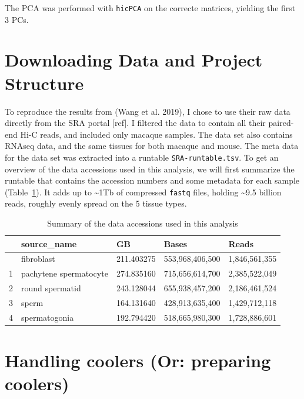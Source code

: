 \documentclass[
  11pt,
  a4paper,
]{scrbook}
\begin{document}
The PCA was performed with \texttt{hicPCA} on the correcte matrices,
yielding the first 3 PCs.

\section{Downloading Data and Project
Structure}\label{downloading-data-and-project-structure}

To reproduce the results from (Wang et al. 2019), I chose to use their
raw data directly from the SRA portal {[}ref{]}. I filtered the data to
contain all their paired-end Hi-C reads, and included only macaque
samples. The data set also contains RNAseq data, and the same tissues
for both macaque and mouse. The meta data for the data set was extracted
into a runtable \texttt{SRA-runtable.tsv}. To get an overview of the
data accessions used in this analysis, we will first summarize the
runtable that contains the accession numbers and some metadata for each
sample (Table~\ref{tbl-runtable-summary}). It adds up to
\textasciitilde1Tb of compressed \texttt{fastq} files, holding
\textasciitilde9.5 billion reads, roughly evenly spread on the 5 tissue
types.

\small

\begin{longtable}[]{@{}lllll@{}}

\caption{\label{tbl-runtable-summary}Summary of the data accessions used
in this analysis}

\tabularnewline

\toprule\noalign{}
& source\_name & GB & Bases & Reads \\
\midrule\noalign{}
\endhead
\bottomrule\noalign{}
\endlastfoot
0 & fibroblast & 211.403275 & 553,968,406,500 & 1,846,561,355 \\
1 & pachytene spermatocyte & 274.835160 & 715,656,614,700 &
2,385,522,049 \\
2 & round spermatid & 243.128044 & 655,938,457,200 & 2,186,461,524 \\
3 & sperm & 164.131640 & 428,913,635,400 & 1,429,712,118 \\
4 & spermatogonia & 192.794420 & 518,665,980,300 & 1,728,886,601 \\

\end{longtable}

\normalsize

\section{Handling coolers (Or: preparing
coolers)}\label{handling-coolers-or-preparing-coolers}
\end{document}
